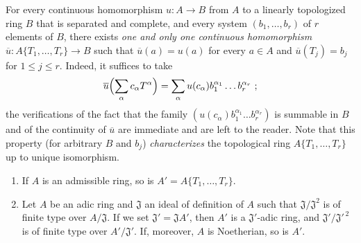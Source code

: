 \begin{env}[7.5.3]
\label{0.7.5.3}
For every continuous homomorphism $u:A\to B$ from $A$ to a linearly
topologized ring $B$ that is separated and complete, and every system $(b_1,\ldots,b_r)$ of $r$
elements of $B$, there exists \emph{one and only one continuous homomorphism}
$\overline u:A\{T_1,\ldots,T_r\}\to B$ such that $\overline u(a)=u(a)$ for
every $a\in A$ and $\overline u(T_j)=b_j$ for $1\leq j\leq r$. Indeed, it suffices
to take
\[
  \overline u\Bigl(\sum_\alpha c_\alpha T^\alpha\Bigr)
  =\sum_\alpha u(c_\alpha)b_1^{\alpha_1}\ldots b_r^{\alpha_r}~;
\]
the verifications of the fact that the family
$(u(c_\alpha)b_1^{\alpha_1}\ldots b_r^{\alpha_r})$ is summable in $B$ and
of the continuity of $\overline u$ are immediate and are left to the reader. Note
that this property (for arbitrary $B$ and $b_j$)
\emph{characterizes} the topological ring $A\{T_1,\ldots,T_r\}$ up to
unique isomorphism.
\end{env}

\begin{proposition}[7.5.4]
\label{0.7.5.4}
\begin{enumerate}
  \item[\textup{(i)}] If $A$ is an admissible ring, so is
  $A'=A\{T_1,\ldots,T_r\}$.
  \item[\textup{(ii)}] Let $A$ be an adic ring and $\mathfrak J$ an ideal of definition
  of $A$ such that $\mathfrak J/\mathfrak J^2$ is of finite type
  over $A/\mathfrak J$. If we set $\mathfrak J'=\mathfrak JA'$, then $A'$ is
  a $\mathfrak J'$-adic ring, and
  $\mathfrak J'/\mathfrak J'^{\,2}$ is of finite type over
  $A'/\mathfrak J'$. If, moreover, $A$ is Noetherian, so is
  $A'$.
\end{enumerate}
\end{proposition}

